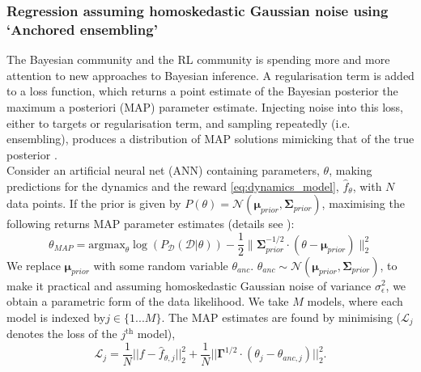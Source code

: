 \documentclass[
reprint,
amsmath,amssymb,amsfonts,clevref,
aps,
prstab,
]{revtex4-2}
\begin{document}
\subsubsection{Regression assuming homoskedastic Gaussian noise using `Anchored ensembling'}
The Bayesian community and the RL community is spending more and more attention to
new approaches to Bayesian inference. A regularisation
term is added to a loss function, which returns a point estimate of
the Bayesian posterior the maximum a posteriori (MAP) parameter estimate. 
Injecting noise into this loss, either to targets or regularisation term, and sampling
repeatedly (i.e. ensembling), produces a distribution of MAP solutions mimicking that of the true posterior \cite{Gu2007, Chen2011, Bardsley2012, Pearce2018}.\\
Consider an artificial neural net (ANN) containing parameters, ${\theta}$, making predictions for the dynamics and the reward \cref{eq:dynamics_model}, $\hat{f}_\theta$, with $N$ data points. If the prior is given by $P(\theta) = \mathcal{N}(\pmb{\mu}_{prior}, \pmb{\Sigma}_{prior})$, maximising the following returns MAP parameter estimates (details see \cite{Pearce2018}):
\begin{equation}
	\label{eq_MAP_loglike_anc}
	{\theta}_{MAP}  = \text{argmax}_{{\theta}} \log( P_{\mathcal{D}}( \mathcal{D} | {\theta} ) ) - 
	\frac{1}{2} 
	\lVert \pmb{\Sigma}_{prior}^{-1/2} \cdot
	({\theta} - \pmb{\mu}_{prior}) \rVert^2_2
\end{equation}
We replace $\pmb{\mu}_{prior}$ with some random variable $ {\theta}_{anc}$.
${\theta}_{anc} \sim \mathcal{N}(\pmb{\mu}_{prior},\pmb{\Sigma}_{prior} )$, to make it practical and
assuming homoskedastic Gaussian noise of variance $\sigma^2_\epsilon$, we obtain a parametric form of the data likelihood. We take $M$ models, where each model is indexed by$j \in \{1 ... M\}$. The MAP estimates are found by minimising ($\mathcal L_{j}$ denotes the loss of the $j^\text{th}$ model),
\begin{equation}
	\label{eqn_anch_loss_matrix}
	\mathcal L_{j} =  
	\frac{1}{N} \lvert \lvert f - \hat{f}_{\theta, j} \rvert \rvert ^2_2
	+ \frac{1}{N} \lvert \lvert \pmb{\Gamma}^{1/2} \cdot (\theta_j - \theta_{anc,j}) \rvert \rvert ^2_2.
\end{equation}
\end{document}
